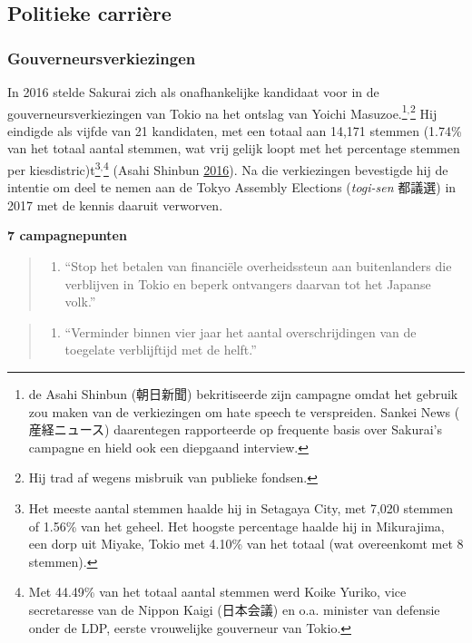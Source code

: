 \documentclass[10.5pt,dutch,]{article}
\providecommand{\tightlist}{%
  \setlength{\itemsep}{0pt}\setlength{\parskip}{0pt}}
\begin{document}
\subsection{Politieke carrière}\label{politieke-carriuxe8re}

\subsubsection{Gouverneursverkiezingen}\label{gouverneursverkiezingen}

In 2016 stelde Sakurai zich als onafhankelijke kandidaat voor in de
gouverneursverkiezingen van Tokio na het ontslag van Yoichi
Masuzoe.\footnote{de Asahi Shinbun (朝日新聞) bekritiseerde zijn campagne
  omdat het gebruik zou maken van de verkiezingen om hate speech te
  verspreiden. Sankei News ( 産経ニュース) daarentegen rapporteerde op
  frequente basis over Sakurai's campagne en hield ook een diepgaand
  interview.}$^{,}$\footnote{Hij trad af wegens misbruik van publieke
  fondsen.} Hij eindigde als vijfde van 21 kandidaten, met een totaal
aan 14,171 stemmen (1.74\% van het totaal aantal stemmen, wat vrij
gelijk loopt met het percentage stemmen per kiesdistric)t\footnote{Het
  meeste aantal stemmen haalde hij in Setagaya City, met 7,020 stemmen
  of 1.56\% van het geheel. Het hoogste percentage haalde hij in
  Mikurajima, een dorp uit Miyake, Tokio met 4.10\% van het totaal (wat
  overeenkomt met 8 stemmen).}$^{,}$\footnote{Met 44.49\% van het totaal
  aantal stemmen werd Koike Yuriko, vice secretaresse van de Nippon
  Kaigi (日本会議) en o.a. minister van defensie onder de LDP, eerste
  vrouwelijke gouverneur van Tokio.} (Asahi Shinbun
\protect\hyperlink{ref-asahiux5fshimbunux5felectionsux5f2016}{2016}). Na
die verkiezingen bevestigde hij de intentie om deel te nemen aan de
Tokyo Assembly Elections (\emph{togi-sen} 都議選) in 2017 met de kennis
daaruit verworven.

\textbf{7 campagnepunten}

\begin{quote}
\begin{enumerate}
\def\labelenumi{\arabic{enumi}.}
\tightlist
\item
  ``Stop het betalen van financiële overheidssteun aan buitenlanders die
  verblijven in Tokio en beperk ontvangers daarvan tot het Japanse
  volk.''
\end{enumerate}
\end{quote}

\begin{quote}
\begin{enumerate}
\def\labelenumi{\arabic{enumi}.}
\setcounter{enumi}{1}
\tightlist
\item
  ``Verminder binnen vier jaar het aantal overschrijdingen van de
  toegelate verblijftijd met de helft.''
\end{enumerate}
\end{quote}
\end{document}
